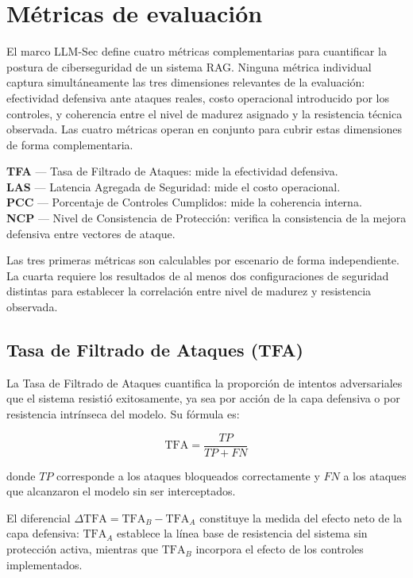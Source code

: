 \chapter{Métricas de evaluación}
\label{ch:metricas}

El marco LLM-Sec define cuatro métricas complementarias para cuantificar
la postura de ciberseguridad de un sistema RAG. Ninguna métrica individual
captura simultáneamente las tres dimensiones relevantes de la evaluación:
efectividad defensiva ante ataques reales, costo operacional introducido
por los controles, y coherencia entre el nivel de madurez asignado y la
resistencia técnica observada. Las cuatro métricas operan en conjunto para
cubrir estas dimensiones de forma complementaria.

\begin{infobox}
  \textbf{TFA} — Tasa de Filtrado de Ataques: mide la efectividad defensiva.\\
  \textbf{LAS} — Latencia Agregada de Seguridad: mide el costo operacional.\\
  \textbf{PCC} — Porcentaje de Controles Cumplidos: mide la coherencia interna.\\
  \textbf{NCP} — Nivel de Consistencia de Protección: verifica la consistencia de la mejora defensiva entre vectores de ataque.
\end{infobox}

Las tres primeras métricas son calculables por escenario de forma
independiente. La cuarta requiere los resultados de al menos dos
configuraciones de seguridad distintas para establecer la correlación
entre nivel de madurez y resistencia observada.


\section{Tasa de Filtrado de Ataques (TFA)}
\label{sec:tfa}

La Tasa de Filtrado de Ataques cuantifica la proporción de intentos
adversariales que el sistema resistió exitosamente, ya sea por acción
de la capa defensiva o por resistencia intrínseca del modelo. Su fórmula es:

\[
  \text{TFA} = \frac{TP}{TP + FN}
\]

donde $TP$ corresponde a los ataques bloqueados correctamente y $FN$ a
los ataques que alcanzaron el modelo sin ser interceptados.

El diferencial $\Delta\text{TFA} = \text{TFA}_B - \text{TFA}_A$ constituye
la medida del efecto neto de la capa defensiva: $\text{TFA}_A$ establece
la línea base de resistencia del sistema sin protección activa, mientras
que $\text{TFA}_B$ incorpora el efecto de los controles implementados.

